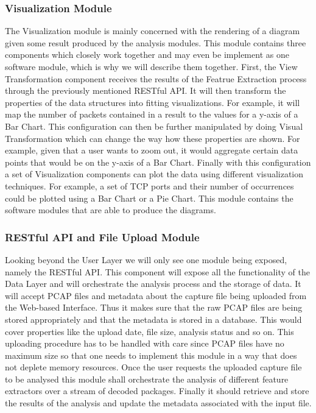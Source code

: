\subsubsection{Visualization Module}
The Visualization module is mainly concerned with the rendering of a diagram given some result produced by the analysis modules. This module contains three components which closely work together and may even be implement as one software module, which is why we will describe them together.
First, the View Transformation component receives the results of the Featrue Extraction process through the previously mentioned RESTful API. It will then transform the properties of the data structures into fitting visualizations. For example, it will map the number of packets contained in a result to the values for a y-axis of a Bar Chart.
This configuration can then be further manipulated by doing Visual Transformation which can change the way how these properties are shown. For example, given that a user wants to zoom out, it would aggregate certain data points that would be on the y-axis of a Bar Chart.
Finally with this configuration a set of Visualization components can plot the data using different visualization techniques. For example, a set of TCP ports and their number of occurrences could be plotted using a Bar Chart or a Pie Chart. This module contains the software modules that are able to produce the diagrams.

\subsubsection{RESTful API and File Upload Module}
Looking beyond the User Layer we will only see one module being exposed, namely the RESTful API. This component will expose all the functionality of the Data Layer and will orchestrate the analysis process and the storage of data.
It will accept PCAP files and metadata about the capture file being uploaded from the Web-based Interface. Thus it makes sure that the raw PCAP files are being stored appropriately and that the metadata is stored in a database. This would cover properties like the upload date, file size, analysis status and so on.
This uploading procedure has to be handled with care since PCAP files have no maximum size so that one needs to implement this module in a way that does not deplete memory resources.
Once the user requests the uploaded capture file to be analysed this module shall orchestrate the analysis of different feature extractors over a stream of decoded packages. Finally it should retrieve and store the results of the analysis and update the metadata associated with the input file.

